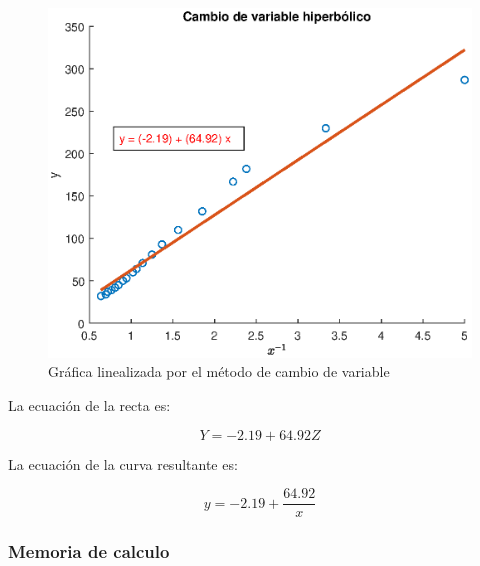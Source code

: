 \documentclass[letter,11pt]{article}
\begin{document}
\begin{figure}[!h]
\centering
\includegraphics[scale=1.00]{eps/3.1.3.eps}
\caption{Gráfica linealizada por el método de cambio de variable}
\label{practica31_3}
\end{figure}

La ecuación de la recta es:

\begin{equation}
    Y = -2.19 + 64.92 Z
\end{equation}

La ecuación de la curva resultante es:

\begin{equation}
    y = -2.19 + \frac{64.92}{x}
\end{equation}

\subsubsection{Memoria de calculo}

\begin{alltt}
\footnotesize

\normalsize
\end{alltt}
\end{document}
